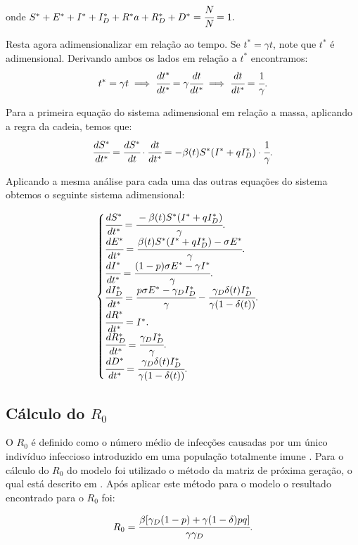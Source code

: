 \documentclass[12pt]{article}
\begin{document}
\noindent onde $S^* + E^* +I^*+I_D^*+R^*a+R_D^*+D^* = \cfrac{N}{N} = 1.$

Resta agora adimensionalizar em relação ao tempo. Se $t^* = \gamma t$, note que $t^*$ é adimensional. Derivando ambos os lados em relação a $t^*$ encontramos:
$$t^* = \gamma t \implies \cfrac{dt^*}{dt^*} = \gamma \cfrac{dt}{dt^*} \implies \cfrac{dt}{dt^*} = \cfrac{1}{\gamma}.$$

Para a primeira equação do sistema adimensional em relação a massa, aplicando a regra da cadeia, temos que:
$$\cfrac{dS^*}{dt^*} = \cfrac{dS^*}{dt} \cdot  \cfrac{dt}{dt^*} = -\beta(t)S^*(I^* + qI_D^*) \cdot \cfrac{1}{\gamma}.$$

Aplicando a mesma análise para cada uma das outras equações do sistema obtemos o seguinte sistema adimensional:

\begin{center}
$$
\begin{cases}
\cfrac{dS^*}{dt^*} = \cfrac{-\beta(t)S^*(I^* + qI_D^*)}{\gamma}. \\
\cfrac{dE^*}{dt^*}  = \cfrac{\beta(t)S^*(I^* + qI_D^*) - \sigma E^* }{\gamma}.\\
\cfrac{dI^*}{dt^*}  = \cfrac{(1-p)\sigma E^* - \gamma I^*}{\gamma}.\\
\cfrac{dI_D^*}{dt^*}  = \cfrac{p\sigma E^* - \gamma_DI_D^*}{\gamma} - \cfrac{\gamma_D \delta (t)I_D^*}{\gamma(1 - \delta(t))}.\\
\cfrac{dR^*}{dt^*}  = I^*.\\
\cfrac{dR_D^*}{dt^*}  = \cfrac{\gamma_DI_D^*}{\gamma}.\\
\cfrac{dD^*}{dt^*}  = \cfrac{\gamma_D \delta (t)I_D^*}{\gamma(1 - \delta(t))}.

\end{cases}
$$
\end{center}


\subsection{Cálculo do $R_0$}

O $R_0$ é definido como o número médio de infecções causadas por um único indivíduo infeccioso introduzido em uma população totalmente imune \cite{randolph2020herd}.
Para o cálculo do $R_0$ do modelo foi utilizado o método da matriz de próxima geração, o qual está descrito em \cite{van2002reproduction}. Após aplicar este método para o modelo o resultado encontrado para o $R_0$ foi: 

$$R_0 = \cfrac{\beta [ \gamma_D (1-p) + \gamma (1 - \delta)pq]}{\gamma \gamma_D}.$$
\end{document}
